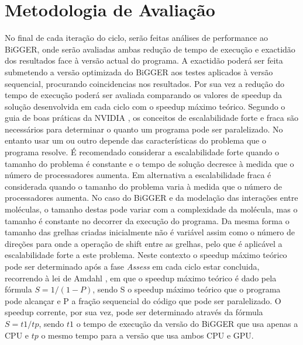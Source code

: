 \section{Metodologia de Avaliação}
No final de cada iteração do ciclo, serão feitas análises de performance ao BiGGER, onde serão avaliadas ambas redução de tempo de execução e exactidão dos resultados face à versão actual do programa.
A exactidão poderá ser feita submetendo a versão optimizada do BiGGER aos testes aplicados à versão sequencial, procurando coincidencias nos resultados. Por sua vez a redução do tempo de execução poderá ser avaliada comparando os valores de speedup da solução desenvolvida em cada ciclo com o speedup máximo teórico. Segundo o guia de boas práticas da NVIDIA \cite{cudaProgGuide}, os conceitos de escalabilidade forte e fraca são necessários para determinar o quanto um programa pode ser paralelizado. No entanto usar um ou outro depende das características do problema que o programa resolve. É recomendado considerar a escalabilidade forte quando o tamanho do problema é constante e o tempo de solução decresce à medida que o número de processadores aumenta. Em alternativa a escalabilidade fraca é considerada quando o tamanho do problema varia à medida que o número de processadores aumenta. No caso do BiGGER e da modelação das interações entre moléculas, o tamanho destas pode variar com a complexidade da molécula, mas o tamanho é constante no decorrer da execução do programa. Da mesma forma o tamanho das grelhas criadas inicialmente não é variável assim como o número de direções para onde a operação de shift entre as grelhas, pelo que é aplicável a escalabilidade forte a este problema. Neste contexto o speedup máximo teórico pode ser determinado após a fase \textit{Assess} em cada ciclo estar concluida, recorrendo à lei de Amdahl \cite{amdahl1967}, em que o speedup máximo teórico é dado pela fórmula $ S = 1 / ( 1 - P )$, sendo S o speedup máximo teórico que o programa pode alcançar e P a fração sequencial do código que pode ser paralelizado. O speedup corrente, por sua vez, pode ser determinado através da fórmula $S = t1/ tp$, sendo $t1$ o tempo de execução da versão do BiGGER que usa apenas a CPU e $tp$ o mesmo tempo para a versão que usa ambos CPU e GPU.
